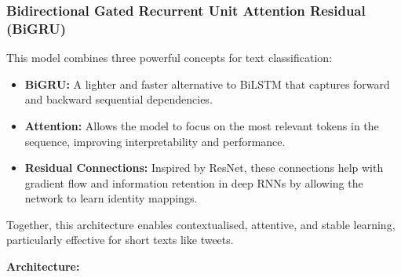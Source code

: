 \documentclass{article}
\begin{document}
\subsubsection{Bidirectional Gated Recurrent Unit Attention Residual (BiGRU)}

This model combines three powerful concepts for text classification:

\begin{itemize}
\item \textbf{BiGRU:} A lighter and faster alternative to BiLSTM that captures forward and backward sequential dependencies.

\item \textbf{Attention:} Allows the model to focus on the most relevant tokens in the sequence, improving interpretability and performance.

\item \textbf{Residual Connections:} Inspired by ResNet, these connections help with gradient flow and information retention in deep RNNs by allowing the network to learn identity mappings.
\end{itemize}

Together, this architecture enables contextualised, attentive, and stable learning, particularly effective for short texts like tweets.

\textbf{Architecture:}
\end{document}
